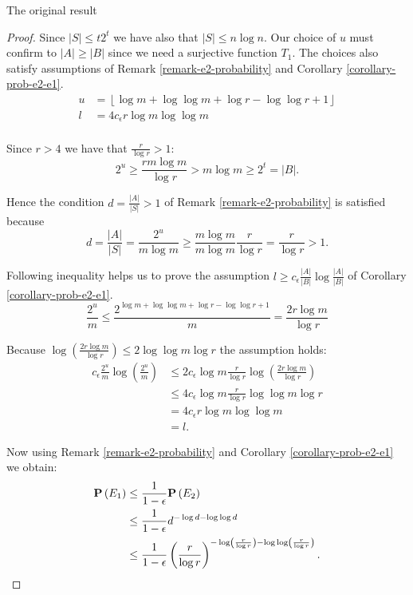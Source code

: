 \begin{section}{The original result}
\begin{proof}
Since $|S| \leq t 2 ^ t$ we have also that $|S| \leq n \log n$. Our choice of $u$ must confirm to $|A| \geq |B|$ since we need a surjective function $T_1$. The choices also satisfy assumptions of Remark \ref{remark-e2-probability} and Corollary \ref{corollary-prob-e2-e1}.
\[
\begin{split}
	u & = \left\lfloor \log m + \log \log m + \log r - \log \log r + 1 \right\rfloor \\
	l & = 4c_{\epsilon}r\log m \log \log m \\
\end{split}
\]

Since $r > 4$ we have that $\frac{r}{\log r} > 1$:
\[
	2 ^ u \geq \frac{rm \log m}{\log r} > m \log m \geq 2 ^ t = |B| \text{.}
\]

Hence the condition $d = \frac{|A|}{|S|} > 1$ of Remark \ref{remark-e2-probability} is satisfied because
\[
	d = \frac{|A|}{|S|} = \frac{2^u}{m \log m} \geq \frac{m \log m}{m \log m}\frac{r}{\log r} = \frac{r}{\log r} > 1 \text{.}
\]

Following inequality helps us to prove the assumption $l \geq c_\epsilon \frac{|A|}{|B|} \log \frac{|A|}{|B|}$ of Corollary \ref{corollary-prob-e2-e1}.
\[
	\frac{2^u}{m} \leq \frac{2 ^{\log m + \log \log m + \log r - \log \log r + 1}}{m} = \frac{2 r\log m}{\log r}
\]

Because $\log \left(\frac{2 r\log m}{\log r}\right) \leq 2 \log \log m \log r$ the assumption holds:
\[
\begin{split}
c_{\epsilon}\frac{2^u}{m}\log\left(\frac{2^u}{m}\right)
	& \leq 2 c_{\epsilon} \log m \frac{r}{\log r} \log \left(\frac{2 r\log m}{\log r}\right) \\
	& \leq 4 c_{\epsilon} \log m \frac{r}{\log r} \log \log m \log r \\
	& = 4 c_{\epsilon} r \log m \log \log m \\
	& = l \text{.}
\end{split}
\]

Now using Remark \ref{remark-e2-probability} and Corollary \ref{corollary-prob-e2-e1} we obtain:
\[
\begin{split}
\mathbf{P}\left(E_1\right)
	& \leq \frac{1}{1 - \epsilon} \mathbf{P}\left(E_2\right) \\
	& \leq \frac{1}{1 - \epsilon} d ^ {-\log d - \log \log d} \\ 
	& \leq \frac{1}{1 - \epsilon} \left(\frac{r}{\log r}\right)^{-\log \left(\frac{r}{\log r}\right) - \log \log \left(\frac{r}{\log r}\right)} \text{.}
\end{split}
\]


\end{proof}
\end{section}
